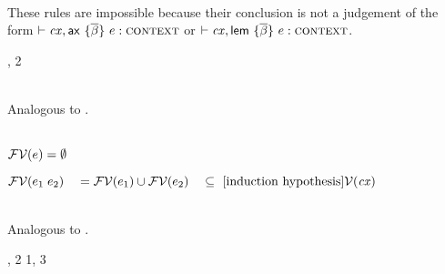 \begin{bycase}

\Case{\Rcxmt, \Rcxtdec, \Rcxodec, \Rcxtdef, \Rcxtvdec, \Rcxvdec}\\
These rules are impossible because their conclusion is not a judgement of the
form $\vdash\mathit{cx},\mathsf{ax}\ \{\overline{\beta}\}\ e:\textsc{context}$ or $\vdash\mathit{cx},\mathsf{lem}\ \{\overline{\beta}\}\ e:\textsc{context}$.

\Case{\Rcxax}
\begin{derivation}
\step{\cxwf{\snoc{\cx}{\axO}}}{\hyp}
\step{\efvar{\expr}\subseteq\cxvar{\snoc{\cx}{\tvdec{\tvarS}}}=\cxvarO}
     {\indhyp, 2}
\end{derivation}

\Case{\Rcxlem}\\
Analogous to \Rcxax.

\Case{\Reop, \Redesc, \Reproj}\\
$\mathcal{FV}(e)=\emptyset$

\Case{\Revar}
\begin{derivation}
\step{\vdecO\in\cx}{\premof{\Revar}}
\end{derivation}

\Case{\Reapp}
\begin{links}
$\mathcal{FV}(e_1\;e_2)
 \\\hspace*{1em}=\\
 \mathcal{FV}(e_1)\cup\mathcal{FV}(e_2)
 \\\hspace*{1em}\subseteq\ [\mbox{induction hypothesis}]\\
 \mathcal{V}(\mathit{cx})$
\end{links}

\Case{\Reeq, \Reif, \ReifO, \Resuper, \Resub}\\
Analogous to \Reapp.

\Case{\Reabs}
\begin{derivation}
\step{\efvar{\expr}\subseteq\cxvar{\snoc{\cx}{\vdecO}}}{\indhyp}
\end{derivation}
\Case{\Reabsalpha}
\begin{derivation}
\step{\efvar{\absO}\subseteq\cxvarO}{\indhyp}
     {, 2}
     {1, 3}
\end{derivation}

\Case{\Rthax}
\begin{derivation}
\step{\axO\in\cx}{\premof{\Rthax}}
\step{\cxwfO}{\premof{\Rthax}}
\step{\efvar{\tsbslash{\expr}{\tvarS}{\typS}}=\efvar{\expr}}
     {}
\end{derivation}


\end{bycase}
